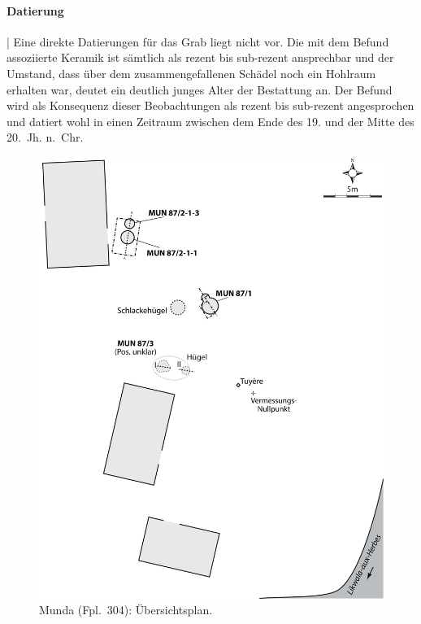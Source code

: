 \paragraph{Datierung}\hspace{-.5em}|\hspace{.5em}%
Eine direkte Datierungen für das Grab liegt nicht vor. Die mit dem Befund assoziierte Keramik ist sämtlich als rezent bis sub-rezent ansprechbar und der Umstand, dass über dem zusammengefallenen Schädel noch ein Hohlraum erhalten war, deutet ein deutlich junges Alter der Bestattung an. Der Befund wird als Konsequenz dieser Beobachtungen als rezent bis sub-rezent angesprochen und datiert wohl in einen Zeitraum zwischen dem Ende des 19. und der Mitte des 20.~Jh. n.~Chr.

\begin{figure}[!tb]
	\begin{minipage}[b]{.66\textwidth}
		\includegraphics[width=\textwidth]{fig/MUN87_Fpl-Plan.pdf}
	\end{minipage}\hfill
	\begin{minipage}[b]{.3\textwidth}
		\caption{Munda (Fpl.~304): Übersichtsplan.}\label{fig:MUN87_Fundstelle}
	\end{minipage}
\end{figure}


